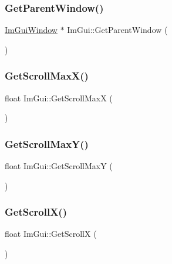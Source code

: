 \subsubsection{\texorpdfstring{Get\+Parent\+Window()}{GetParentWindow()}}
{\footnotesize\ttfamily \hyperlink{struct_im_gui_window}{Im\+Gui\+Window} $\ast$ Im\+Gui\+::\+Get\+Parent\+Window (\begin{DoxyParamCaption}{ }\end{DoxyParamCaption})}

\hypertarget{namespace_im_gui_af472cb090157c22e65a0aa1662b9f3d0}{}\label{namespace_im_gui_af472cb090157c22e65a0aa1662b9f3d0} 
\subsubsection{\texorpdfstring{Get\+Scroll\+Max\+X()}{GetScrollMaxX()}}
{\footnotesize\ttfamily float Im\+Gui\+::\+Get\+Scroll\+MaxX (\begin{DoxyParamCaption}{ }\end{DoxyParamCaption})}

\hypertarget{namespace_im_gui_ab34c0d5c63908a7ff50923151730f76a}{}\label{namespace_im_gui_ab34c0d5c63908a7ff50923151730f76a} 
\subsubsection{\texorpdfstring{Get\+Scroll\+Max\+Y()}{GetScrollMaxY()}}
{\footnotesize\ttfamily float Im\+Gui\+::\+Get\+Scroll\+MaxY (\begin{DoxyParamCaption}{ }\end{DoxyParamCaption})}

\hypertarget{namespace_im_gui_a6f88335d87da3be81dc6e24cb1812923}{}\label{namespace_im_gui_a6f88335d87da3be81dc6e24cb1812923} 
\subsubsection{\texorpdfstring{Get\+Scroll\+X()}{GetScrollX()}}
{\footnotesize\ttfamily float Im\+Gui\+::\+Get\+ScrollX (\begin{DoxyParamCaption}{ }\end{DoxyParamCaption})}


